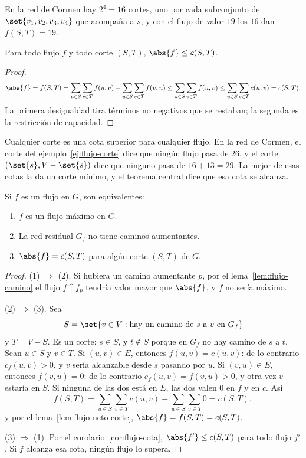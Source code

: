 \documentclass[11pt,letterpaper]{article}
\begin{document}
En la red de Cormen hay $2^4 = 16$ cortes, uno por cada subconjunto de
$\set{v_1, v_2, v_3, v_4}$ que acompaña a $s$, y con el flujo de valor
$19$ los $16$ dan $f(S, T) = 19$.

\begin{corolario}\label{cor:flujo-cota}
  Para todo flujo $f$ y todo corte $(S, T)$, $\abs{f} \le c(S, T)$.
\end{corolario}

\begin{proof}
  \[
    \abs{f} = f(S, T)
    = \sum_{u \in S} \sum_{v \in T} f(u, v)
      - \sum_{u \in S} \sum_{v \in T} f(v, u)
    \le \sum_{u \in S} \sum_{v \in T} f(u, v)
    \le \sum_{u \in S} \sum_{v \in T} c(u, v) = c(S, T) .
  \]
  La primera desigualdad tira términos no negativos que se restaban;
  la segunda es la restricción de capacidad.
\end{proof}

Cualquier corte es una cota superior para cualquier flujo. En la red
de Cormen, el corte del ejemplo~\ref{ej:flujo-corte} dice que ningún
flujo pasa de $26$, y el corte $(\set{s}, V - \set{s})$ dice que
ninguno pasa de $16 + 13 = 29$. La mejor de esas cotas la da un corte
mínimo, y el teorema central dice que esa cota se alcanza.

\begin{teorema}\label{teo:flujo-corte}
  Si $f$ es un flujo en $G$, son equivalentes:
  \begin{enumerate}
    \item $f$ es un flujo máximo en $G$.
    \item La red residual $G_f$ no tiene caminos aumentantes.
    \item $\abs{f} = c(S, T)$ para algún corte $(S, T)$ de $G$.
  \end{enumerate}
\end{teorema}

\begin{proof}
  (1) $\Rightarrow$ (2). Si hubiera un camino aumentante $p$, por el
  lema~\ref{lem:flujo-camino} el flujo $f \uparrow f_p$ tendría valor
  mayor que $\abs{f}$, y $f$ no sería máximo.

  (2) $\Rightarrow$ (3). Sea
  \[
    S = \set{v \in V : \text{hay un camino de } s \text{ a } v
             \text{ en } G_f}
  \]
  y $T = V - S$. Es un corte: $s \in S$, y $t \notin S$ porque en
  $G_f$ no hay camino de $s$ a $t$. Sean $u \in S$ y $v \in T$. Si
  $(u, v) \in E$, entonces $f(u, v) = c(u, v)$: de lo contrario
  $c_f(u, v) > 0$, y $v$ sería alcanzable desde $s$ pasando por $u$.
  Si $(v, u) \in E$, entonces $f(v, u) = 0$: de lo contrario
  $c_f(u, v) = f(v, u) > 0$, y otra vez $v$ estaría en $S$. Si ninguna
  de las dos está en $E$, las dos valen $0$ en $f$ y en $c$. Así
  \[
    f(S, T) = \sum_{u \in S} \sum_{v \in T} c(u, v)
            - \sum_{u \in S} \sum_{v \in T} 0 = c(S, T) ,
  \]
  y por el lema~\ref{lem:flujo-neto-corte}, $\abs{f} = f(S, T) =
  c(S, T)$.

  (3) $\Rightarrow$ (1). Por el corolario~\ref{cor:flujo-cota},
  $\abs{f'} \le c(S, T)$ para todo flujo $f'$. Si $f$ alcanza esa
  cota, ningún flujo lo supera.
\end{proof}
\end{document}
